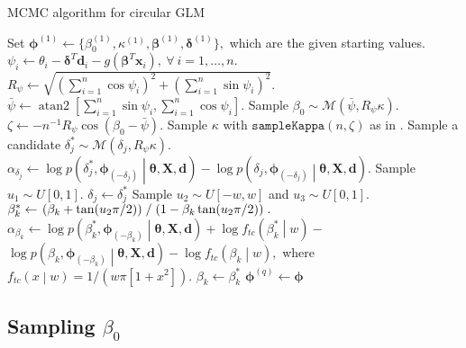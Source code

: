 \documentclass[11pt,a4paper]{article}\usepackage[]{graphicx}\usepackage[]{color}
\DeclareMathOperator{\atantwo}{atan2}
\newcommand{\bx}{\boldsymbol{x}}
\newcommand{\bX}{\boldsymbol{X}}
\newcommand{\bt}{\boldsymbol{\theta}}
\newcommand{\bd}{\boldsymbol{d}}
\newcommand{\bdt}{\boldsymbol{\delta}}
\newcommand{\bbt}{\boldsymbol{\beta}}
\newcommand{\bph}{\boldsymbol{\phi}}
\newcommand{\thedata}{\bt, \bX, \bd}
\newcommand{\relmiddle}[1]{\mathrel{}\middle#1\mathrel{}}
\begin{document}
\begin{algorithm}
\caption{MCMC algorithm for circular GLM}\label{alg}
\begin{algorithmic}
\State Set \( \bph^{(1)} \gets \{ \beta_0^{(1)}, \kappa^{(1)}, \bbt^{(1)}, \bdt^{(1)} \},\) which are the given starting values.
  \State \( \psi_i \gets \theta_i - \bdt^T \bd_i- g(\bbt^T \bx_i ), ~ \forall ~ i = 1, \dots, n. \)
  \State \( R_\psi \gets \sqrt{ \left(\sum_{i = 1}^n \cos \psi_i \right) ^2 + \left( \sum_{i = 1}^n \sin \psi_i \right)^2}.\)
  \State \( \bar{\psi} \gets \atantwo \left[ \sum_{i = 1}^n \sin \psi_i , \sum_{i = 1}^n \cos \psi_i  \right].\)
  \State Sample \( \beta_0 \sim \mathcal{M} \left(\bar{\psi}, R_\psi \kappa \right).\)
  \State \( \zeta \gets -  n^{-1} R_\psi \cos \left( \beta_0 - \bar{\psi} \right).\)
  \State Sample \( \kappa \) with \( \texttt{sampleKappa} (n, \zeta) \) as in \citet{forbes2015fast}.
    \State Sample a candidate \( \delta_j^{*} \sim \mathcal{M} \left( \delta_j, R_\psi \kappa \right).\)
    \State \( \alpha_{\delta_j} \gets \log p \left(\delta_j^{*}, \bph_{(-\delta_j)} \relmiddle| \thedata \right)  - \log p \left(\delta_j, \bph_{(-\delta_j)} \relmiddle| \thedata \right).\)
    \State Sample \( u_1 \sim U[0, 1]. \)
      \State \( \delta_j \gets \delta_j^{*} \)
    \EndIf
  \EndFor
    \State Sample \( u_2 \sim  U[-w, w] \) and \( u_3 \sim U[0, 1]. \)
    \State \( \beta_k^{*} \gets \left. \left( \beta_k + \tan(u_2 \pi / 2) \right) \relmiddle/ \left( 1 - \beta_k \tan(u_2 \pi / 2) \right) \right. .\)
    \State \( \alpha_{\beta_k} \gets \log p \left( \beta_k^{*}, \bph_{(-\beta_k)}  \relmiddle| \thedata \right) + \log f_{tc} \left(\beta_k^{*} \relmiddle|  w \right) - \)
    \State  \hspace{1.055cm} \(  \log p \left(\beta_k, \bph_{(-\beta_k)}  \relmiddle| \thedata \right)      - \log f_{tc} \left( \beta_k \relmiddle|  w \right), \)
    \State where \( f_{tc} \left( x \relmiddle|  w \right) = 1 / \left( w \pi \left[ 1 + x^2 \right] \right).\)
      \State \( \beta_k \gets \beta_k^{*} \)
    \EndIf
  \EndFor
  \State \( \bph^{(q)} \gets \bph \)
\EndFor
\end{algorithmic}
\end{algorithm}





\subsection{Sampling $\beta_0$}
\end{document}
